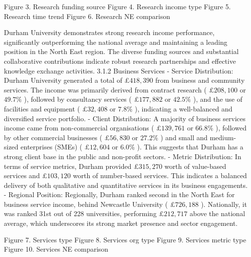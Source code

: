 Figure 3. Research funding source 
Figure 4. Research income type
Figure 5. Research time trend 
Figure 6. Research NE comparison

Durham University demonstrates strong research income performance, significantly outperforming the national average and maintaining a leading position in the North East region. The diverse funding sources and substantial collaborative contributions indicate robust research partnerships and effective knowledge exchange activities.
3.1.2 Business Services
- Service Distribution: Durham University generated a total of $£ 418,390$ from business and community services. The income was primarily derived from contract research ( $£ 208,100$ or $49.7 \%$ ), followed by consultancy services ( $£ 177,882$ or $42.5 \%$ ), and the use of facilities and equipment ( $£ 32,408$ or $7.8 \%$ ), indicating a well-balanced and diversified service portfolio.
- Client Distribution: A majority of business services income came from non-commercial organisations ( $£ 139,761$ or $66.8 \%$ ), followed by other commercial businesses ( $£ 56,830$ or $27.2 \%$ ) and small and medium-sized enterprises (SMEs) ( $£ 12,604$ or $6.0 \%$ ). This suggests that Durham has a strong client base in the public and non-profit sectors.
- Metric Distribution: In terms of service metrics, Durham provided $£ 315,270$ worth of value-based services and $£ 103,120$ worth of number-based services. This indicates a balanced delivery of both qualitative and quantitative services in its business engagements.
- Regional Position: Regionally, Durham ranked second in the North East for business service income, behind Newcastle University ( $£ 726,188$ ). Nationally, it was ranked 31st out of 228 universities, performing $£ 212,717$ above the national average, which underscores its strong market presence and sector engagement.

Figure 7. Services type Figure 8. Services org type
Figure 9. Services metric type Figure 10. Services NE comparison

